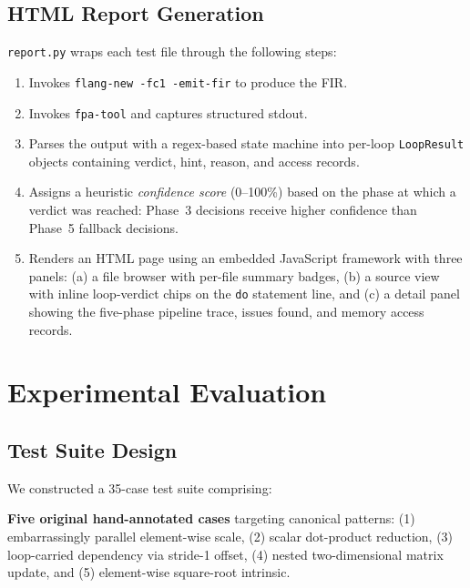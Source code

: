 \documentclass[conference]{IEEEtran}
\begin{document}
\subsection{HTML Report Generation}

\texttt{report.py} wraps each test file through the following steps:
\begin{enumerate}
  \item Invokes \texttt{flang-new -fc1 -emit-fir} to produce the FIR.
  \item Invokes \texttt{fpa-tool} and captures structured stdout.
  \item Parses the output with a regex-based state machine into
        per-loop \texttt{LoopResult} objects containing verdict,
        hint, reason, and access records.
  \item Assigns a heuristic \emph{confidence score} (0--100\%) based
        on the phase at which a verdict was reached: Phase~3
        decisions receive higher confidence than Phase~5 fallback
        decisions.
  \item Renders an HTML page using an embedded JavaScript framework
        with three panels: (a) a file browser with per-file summary
        badges, (b) a source view with inline loop-verdict chips on
        the \texttt{do} statement line, and (c) a detail panel showing
        the five-phase pipeline trace, issues found, and memory access
        records.
\end{enumerate}

\section{Experimental Evaluation}
\label{sec:evaluation}

\subsection{Test Suite Design}

We constructed a 35-case test suite comprising:

\textbf{Five original hand-annotated cases} targeting canonical
patterns: (1) embarrassingly parallel element-wise scale,
(2) scalar dot-product reduction, (3) loop-carried dependency via
stride-1 offset, (4) nested two-dimensional matrix update, and
(5) element-wise square-root intrinsic.
\end{document}
